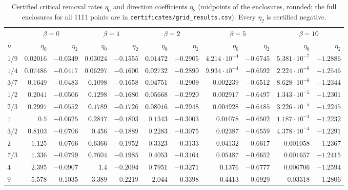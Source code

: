 \begin{table}[ht]
\centering\scriptsize
\setlength{\tabcolsep}{3pt}
\begin{tabular}{lrrrrrrrrrr}
\toprule
 & \multicolumn{2}{c}{$\beta=0$} & \multicolumn{2}{c}{$\beta=1$} & \multicolumn{2}{c}{$\beta=2$} & \multicolumn{2}{c}{$\beta=5$} & \multicolumn{2}{c}{$\beta=10$}\\
$\nu$ & $\eta_0$ & $\eta_2$ & $\eta_0$ & $\eta_2$ & $\eta_0$ & $\eta_2$ & $\eta_0$ & $\eta_2$ & $\eta_0$ & $\eta_2$\\
\midrule
$1/9$ & $0.02016$ & $-0.0349$ & $0.03024$ & $-0.1555$ & $0.01472$ & $-0.2905$ & $4.214\cdot10^{-4}$ & $-0.6745$ & $5.381\cdot10^{-7}$ & $-1.2886$\\
$1/4$ & $0.07486$ & $-0.0417$ & $0.06297$ & $-0.1600$ & $0.02732$ & $-0.2890$ & $9.934\cdot10^{-4}$ & $-0.6592$ & $2.224\cdot10^{-6}$ & $-1.2546$\\
$3/7$ & $0.1649$ & $-0.0483$ & $0.1098$ & $-0.1658$ & $0.04751$ & $-0.2909$ & $0.002239$ & $-0.6512$ & $8.628\cdot10^{-6}$ & $-1.2344$\\
$1/2$ & $0.2041$ & $-0.0506$ & $0.1298$ & $-0.1680$ & $0.05668$ & $-0.2920$ & $0.002917$ & $-0.6497$ & $1.343\cdot10^{-5}$ & $-1.2301$\\
$2/3$ & $0.2997$ & $-0.0552$ & $0.1789$ & $-0.1726$ & $0.08016$ & $-0.2948$ & $0.004928$ & $-0.6485$ & $3.226\cdot10^{-5}$ & $-1.2245$\\
$1$ & $0.5$ & $-0.0625$ & $0.2847$ & $-0.1803$ & $0.1343$ & $-0.3003$ & $0.01078$ & $-0.6502$ & $1.187\cdot10^{-4}$ & $-1.2232$\\
$3/2$ & $0.8103$ & $-0.0706$ & $0.456$ & $-0.1889$ & $0.2283$ & $-0.3075$ & $0.02387$ & $-0.6559$ & $4.378\cdot10^{-4}$ & $-1.2291$\\
$2$ & $1.125$ & $-0.0766$ & $0.6366$ & $-0.1952$ & $0.3323$ & $-0.3133$ & $0.04132$ & $-0.6617$ & $0.001058$ & $-1.2367$\\
$7/3$ & $1.336$ & $-0.0799$ & $0.7604$ & $-0.1985$ & $0.4053$ & $-0.3164$ & $0.05487$ & $-0.6652$ & $0.001657$ & $-1.2415$\\
$4$ & $2.395$ & $-0.0907$ & $1.4$ & $-0.2094$ & $0.7951$ & $-0.3271$ & $0.1376$ & $-0.6777$ & $0.006706$ & $-1.2594$\\
$9$ & $5.578$ & $-0.1035$ & $3.389$ & $-0.2219$ & $2.044$ & $-0.3398$ & $0.4413$ & $-0.6929$ & $0.03318$ & $-1.2806$\\
\bottomrule
\end{tabular}
\caption{Certified critical removal rates $\eta_0$ and direction coefficients $\eta_2$ (midpoints of the enclosures, rounded; the full enclosures for all 1111 points are in \texttt{certificates/grid\_results.csv}). Every $\eta_2$ is certified negative.}\label{tab:grid}
\end{table}
